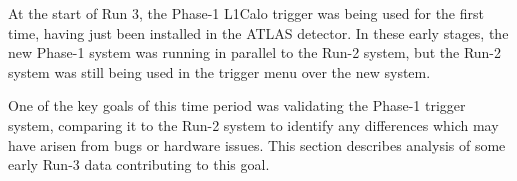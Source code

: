 


At the start of Run 3, the Phase-1 \ac{L1Calo} trigger was being used for the
first time, having just been installed in the \ac{ATLAS} detector. In these
early stages, the new Phase-1 system was running in parallel to the Run-2
system, but the Run-2 system was still being used in the trigger menu over the
new system.

One of the key goals of this time period was validating the Phase-1 trigger
system, comparing it to the Run-2 system to identify any differences which may
have arisen from bugs or hardware issues. This section describes analysis of
some early Run-3 data contributing to this goal.
